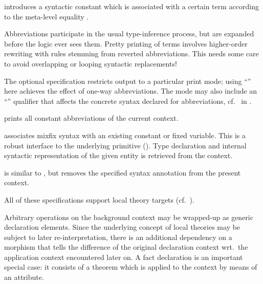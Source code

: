 \begin{isabellebody}
\begin{isamarkuptext}
\begin{descr}
  \item [\hyperlink{command.abbreviation}{\mbox{\isa{\isacommand{abbreviation}}}}~\isa{{\isachardoublequote}c\ {\isasymWHERE}\ eq{\isachardoublequote}}] introduces
  a syntactic constant which is associated with a certain term
  according to the meta-level equality .
  
  Abbreviations participate in the usual type-inference process, but
  are expanded before the logic ever sees them.  Pretty printing of
  terms involves higher-order rewriting with rules stemming from
  reverted abbreviations.  This needs some care to avoid overlapping
  or looping syntactic replacements!
  
  The optional  specification restricts output to a
  particular print mode; using ``'' here achieves the
  effect of one-way abbreviations.  The mode may also include an
  ``\hyperlink{keyword.output}{\mbox{}}'' qualifier that affects the concrete syntax
  declared for abbreviations, cf.\ \hyperlink{command.syntax}{\mbox{}} in
  .
  
  \item [\hyperlink{command.print_abbrevs}{\mbox{\isa{\isacommand{print{\isacharunderscore}abbrevs}}}}] prints all constant abbreviations
  of the current context.
  
  \item [\hyperlink{command.notation}{\mbox{\isa{\isacommand{notation}}}}~\isa{{\isachardoublequote}c\ {\isacharparenleft}mx{\isacharparenright}{\isachardoublequote}}] associates mixfix
  syntax with an existing constant or fixed variable.  This is a
  robust interface to the underlying \hyperlink{command.syntax}{\mbox{}} primitive
  ().  Type declaration and internal syntactic
  representation of the given entity is retrieved from the context.
  
  \item [\hyperlink{command.no_notation}{\mbox{\isa{\isacommand{no{\isacharunderscore}notation}}}}] is similar to \hyperlink{command.notation}{\mbox{}}, but removes the specified syntax annotation from the
  present context.

  \end{descr}

  All of these specifications support local theory targets (cf.\
  ).%
\end{isamarkuptext}%
\isamarkuptrue%
%
\isamarkuptrue%
%
\begin{isamarkuptext}%
Arbitrary operations on the background context may be wrapped-up as
  generic declaration elements.  Since the underlying concept of local
  theories may be subject to later re-interpretation, there is an
  additional dependency on a morphism that tells the difference of the
  original declaration context wrt.\ the application context
  encountered later on.  A fact declaration is an important special
  case: it consists of a theorem which is applied to the context by
  means of an attribute.


\end{isamarkuptext}
\end{isabellebody}
